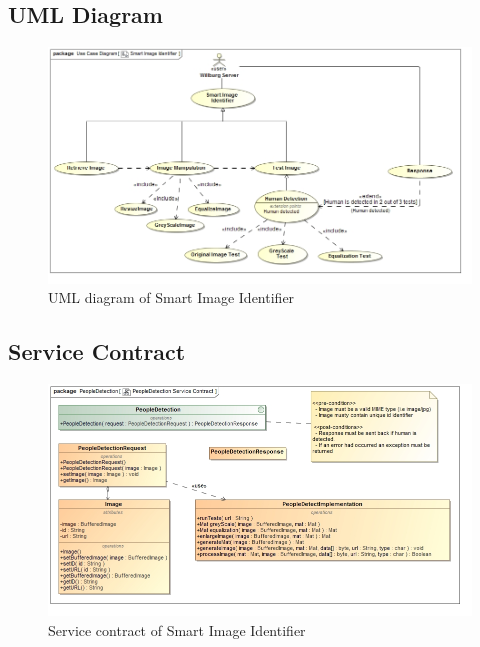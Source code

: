 \documentclass[a4paper,12pt]{report}
\begin{document}
	\subsection {UML Diagram}
	\begin{figure}[htb]
		\centering
		\includegraphics [scale=0.5]{../Diagrams/UML_Diagram.jpg}
		\caption{UML diagram of Smart Image Identifier}
	\end{figure}	
	\FloatBarrier

	\newpage
	\subsection {Service Contract}
	\begin{figure}[htb]
		\centering
		\includegraphics [scale=0.5]{../Diagrams/PeopleDetection_Service_Contract.jpg}
		\caption{Service contract of Smart Image Identifier}
	\end{figure}	
	\FloatBarrier

\newpage
\end{document}
